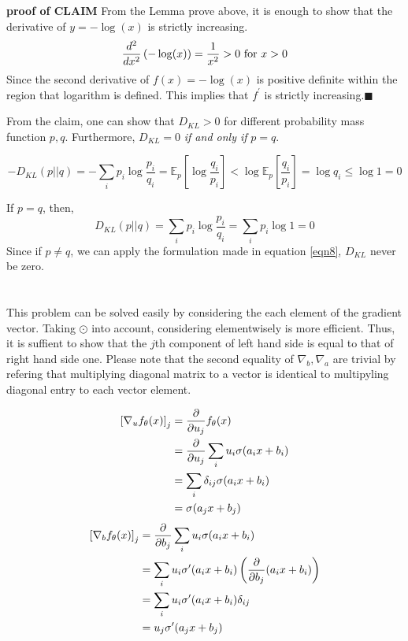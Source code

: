 \documentclass[10pt]{article}
\begin{document}
\textbf{proof of CLAIM}
From the Lemma prove above, it is enough to show that the derivative of $y = -\log(x)$ is strictly increasing. 
\begin{equation}
    {d^2 \over dx^2} \left(-\log(x)\right) = \frac{1}{x^2} >0 \text{ for } x>0
\end{equation}
Since the second derivative of $f(x) = -\log(x)$ is positive definite within the region that logarithm is defined. 
This implies that $f^\prime$ is strictly increasing.$\blacksquare$


From the claim, one can show that $D_{KL}>0$ for different probability mass function $p, q$. Furthermore, $D_{KL}=0$ \textit{if and only if} $p = q$.  

\begin{equation}
    -D_{KL}(p||q) = -\sum_i p_i\log{\frac{p_i}{q_i}} = \mathbb{E}_{p}\left[\log{\frac{q_i}{p_i}}\right] < \log{\mathbb{E}_p\left[\frac{q_i}{p_i}\right]} = \log q_i \le \log 1 = 0 
    \label{eqn8}
\end{equation}

If $p=q$, then, 
\begin{equation}
    D_{KL}(p||q) = \sum_i p_i \log{\frac{p_i}{q_i}} = \sum_i p_i \log{1} = 0
\end{equation}
Since if $p\neq q$, we can apply the formulation made in equation \ref{eqn8}, $D_{KL}$ never be zero. 
\section{}
\section{}
This problem can be solved easily by considering the each element of the gradient vector. Taking $\odot$ into account, considering elementwisely is more efficient. Thus, it is suffient to show that the $j$th component of left hand side is equal to that of right hand side one. Please note that the second equality of $\nabla_b, \nabla_a$ are trivial by refering that multiplying diagonal matrix to a vector is identical to multipyling diagonal entry to each vector element. 

\begin{align*}
    \left[\nabla_u f_\theta(x)\right]_j &= {\partial \over \partial u_j} f_\theta(x) \\
    &= {\partial \over \partial u_j} \sum_i u_i \sigma(a_ix + b_i) \\
    &= \sum_i \delta_{ij} \sigma(a_ix + b_i)\\
    &= \sigma(a_jx + b_j)
\end{align*}
\begin{align*}
    \left[\nabla_b f_\theta(x)\right]_j &= {\partial \over \partial b_j} \sum_i u_i \sigma(a_ix + b_i) \\
    &= \sum_i u_i \sigma^\prime(a_ix + b_i)\left({\partial \over \partial b_j} (a_ix + b_i)\right) \\
    &= \sum_i u_i \sigma^\prime(a_ix + b_i)\delta_{ij}\\
    & = u_j \sigma^\prime(a_jx + b_j)
\end{align*}
\end{document}
